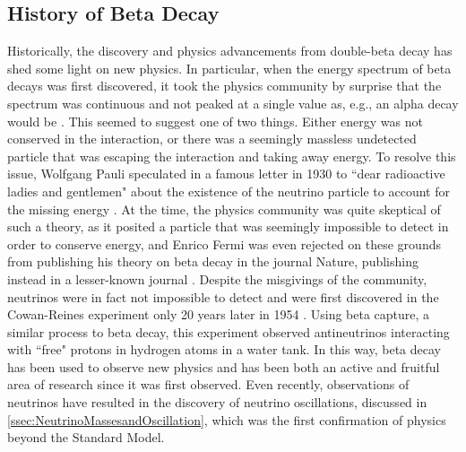 \subsection{History of Beta Decay}
Historically, the discovery and physics advancements from double-beta decay has shed some light on new physics.
In particular, when the energy spectrum of beta decays was first discovered, it took the physics community by surprise that the spectrum was continuous and not peaked at a single value as, e.g., an alpha decay would be \cite{o.vonbayero.hahnl.meitner}.
This seemed to suggest one of two things. Either energy was not conserved in the interaction, or there was a seemingly massless undetected particle that was escaping the interaction and taking away energy.
To resolve this issue, Wolfgang Pauli speculated in a famous letter in 1930 to ``dear radioactive ladies and gentlemen" about the existence of the neutrino particle to account for the missing energy \cite{pauli_1930}.
At the time, the physics community was quite skeptical of such a theory, as it posited a particle that was seemingly impossible to detect in order to conserve energy, and Enrico Fermi was even rejected on these grounds from publishing his theory on beta decay in the journal Nature, publishing instead in a lesser-known journal \cite{fermi_1934}.
Despite the misgivings of the community, neutrinos were in fact not impossible to detect and were first discovered in the Cowan-Reines experiment only 20 years later in 1954 \cite{PhysRev.92.830}.
Using beta capture, a similar process to beta decay, this experiment observed antineutrinos interacting with ``free" protons in hydrogen atoms in a water tank. 
In this way, beta decay has been used to observe new physics and has been both an active and fruitful area of research since it was first observed.
Even recently, observations of neutrinos have resulted in the discovery of neutrino oscillations, discussed in \autoref{ssec:NeutrinoMassesandOscillation}, which was the first confirmation of physics beyond the Standard Model.
